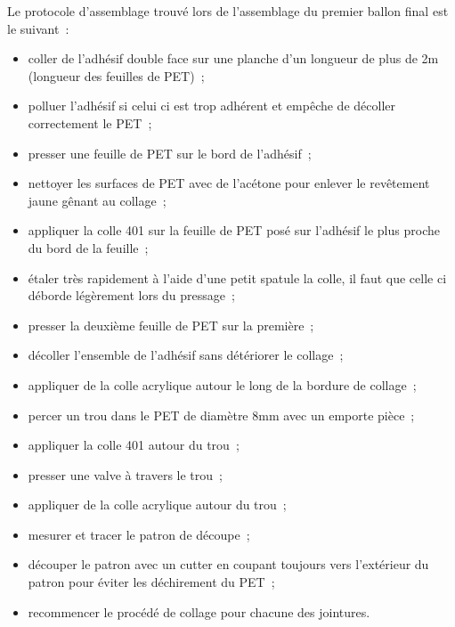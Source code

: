\documentclass[a4paper,11pt]{article}
\begin{document}
Le protocole d'assemblage trouvé lors de l'assemblage du premier ballon final est le suivant~:
\begin{itemize}
 \item coller de l'adhésif double face sur une planche d'un longueur de plus de 2m (longueur des feuilles de PET)~;
 \item polluer l'adhésif si celui ci est trop adhérent et empêche de décoller correctement le PET~;
 \item presser une feuille de PET sur le bord de l'adhésif~;
 \item nettoyer les surfaces de PET avec de l'acétone pour enlever le revêtement jaune gênant au collage~;
 \item appliquer la colle 401 sur la feuille de PET posé sur l'adhésif le plus proche du bord de la feuille~;
 \item étaler très rapidement à l'aide d'une petit spatule la colle, il faut que celle ci déborde légèrement lors du pressage~;
 \item presser la deuxième feuille de PET sur la première~;
 \item décoller l'ensemble de l'adhésif sans détériorer le collage~;
 \item appliquer de la colle acrylique autour le long de la bordure de collage~;
 \item percer un trou dans le PET de diamètre 8mm avec un emporte pièce~;
 \item appliquer la colle 401 autour du trou~;
 \item presser une valve à travers le trou~;
 \item appliquer de la colle acrylique autour du trou~;
 \item mesurer et tracer le patron de découpe~;
 \item découper le patron avec un cutter en coupant toujours vers l'extérieur du patron pour éviter les déchirement du PET~;
 \item recommencer le procédé de collage pour chacune des jointures.
\end{itemize}
\end{document}
